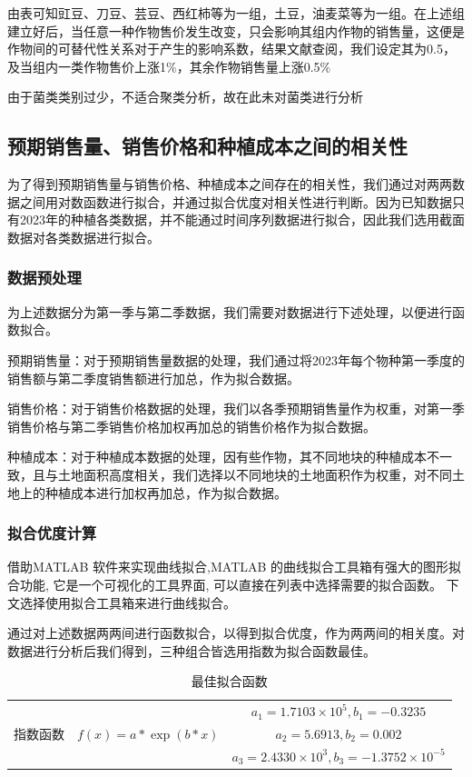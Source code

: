 \documentclass[withoutpreface,bwprint]{cumcmthesis} %
\begin{document}
	
由表可知豇豆、刀豆、芸豆、西红柿等为一组，土豆，油麦菜等为一组。在上述组建立好后，当任意一种作物售价发生改变，只会影响其组内作物的销售量，这便是作物间的可替代性关系对于产生的影响系数，结果文献查阅，我们设定其为0.5，及当组内一类作物售价上涨1$\%$，其余作物销售量上涨0.5$\%$

由于菌类类别过少，不适合聚类分析，故在此未对菌类进行分析

\subsection{预期销售量、销售价格和种植成本之间的相关性}

为了得到预期销售量与销售价格、种植成本之间存在的相关性，我们通过对两两数据之间用对数函数进行拟合，并通过拟合优度对相关性进行判断。因为已知数据只有2023年的种植各类数据，并不能通过时间序列数据进行拟合，因此我们选用截面数据对各类数据进行拟合。

\subsubsection{数据预处理}
为上述数据分为第一季与第二季数据，我们需要对数据进行下述处理，以便进行函数拟合。

预期销售量：对于预期销售量数据的处理，我们通过将2023年每个物种第一季度的销售额与第二季度销售额进行加总，作为拟合数据。

销售价格：对于销售价格数据的处理，我们以各季预期销售量作为权重，对第一季销售价格与第二季销售价格加权再加总的销售价格作为拟合数据。

种植成本：对于种植成本数据的处理，因有些作物，其不同地块的种植成本不一致，且与土地面积高度相关，我们选择以不同地块的土地面积作为权重，对不同土地上的种植成本进行加权再加总，作为拟合数据。

\subsubsection{拟合优度计算}

借助MATLAB 软件来实现曲线拟合,MATLAB 的曲线拟合工具箱有强大的图形拟合功能, 它是一个可视化的工具界面, 可以直接在列表中选择需要的拟合函数。 下文选择使用拟合工具箱来进行曲线拟合。

通过对上述数据两两间进行函数拟合，以得到拟合优度，作为两两间的相关度。对数据进行分析后我们得到，三种组合皆选用指数为拟合函数最佳。
\begin{table}[htbp]
	\centering
	\caption{最佳拟合函数}
	\begin{tabular}{ccc}
		\toprule
		& &$a_1=1.7103\times 10^{5},b_1=-0.3235$\\
		指数函数&$f(x)=a*\exp(b* x)$&$a_2=5.6913,b_2=0.002$\\
		&&$a_3=2.4330\times 10^{3},b_3=-1.3752\times 10^{-5}$\\
		
		\bottomrule
	\end{tabular}%
	\label{tab:addlabel}%
\end{table}%
\end{document}
